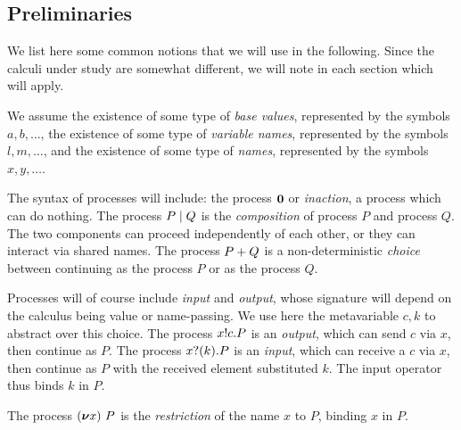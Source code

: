 \long{}
\newenvironment{metanote}{\begin{quote}\message{note!}[\begingroup\it}%
                         {\endgroup]\end{quote}}
\long{}

\subsection{Preliminaries}
\label{sec:prelim}

We list here some common notions that we will use in the following. Since the calculi under study are somewhat different, we will note in each section which will apply.

We assume the existence of some type of \emph{base values}, represented by the symbols
\( a, b, \dots \), the existence of some type
of \emph{variable names}, represented by the symbols
\( l, m, \dots \), and the existence of some type of \emph{names},
represented by the symbols \( x, y, \dots \).  %

The syntax of processes will include:
the process \( \bm{0} \) or \emph{inaction}, a process which can do nothing. The process \( P \mid Q \) is the \emph{composition} of process \( P \) and process \( Q \).
The two components can proceed independently of each other, or they can interact via shared names. The process \( P + Q \) is a non-deterministic \emph{choice} between continuing as the process \( P \) or as the process \( Q \).

Processes will of course include \emph{input} and \emph{output}, whose
signature will depend on the calculus being value or name-passing. We
use here the metavariable $c,k$ to abstract over this choice.  The
process \( x ! c . P \) is an \emph{output}, which can send
\( c \) via \( x \), then continue as \( P \).  %
  The process
\( x ? (k) . P \) is an \emph{input}, which can receive a $c$
via \( x \), then continue as \( P \) with the received element
substituted \( k \).  The input operator thus
binds \( k \) in \( P \).

The process \( (\bm{\nu} x)~P \) is the \emph{restriction} of the name
\( x \) to \( P \), binding \( x \) in \( P \).


